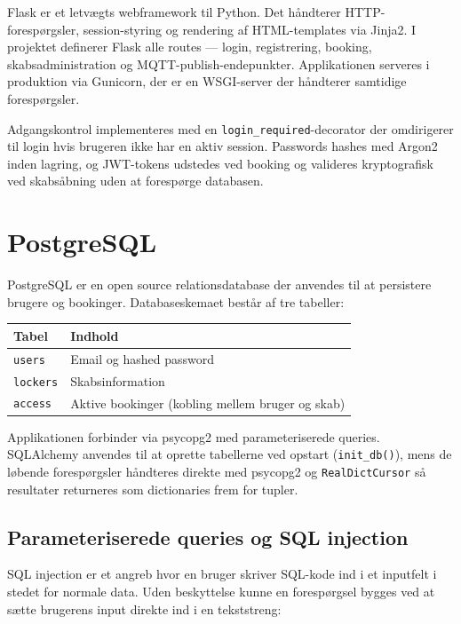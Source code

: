 \documentclass[a4paper,12pt]{article}
\begin{document}
Flask er et letvægts webframework til Python. Det håndterer HTTP-forespørgsler, session-styring og rendering af HTML-templates via Jinja2. I projektet definerer Flask alle routes — login, registrering, booking, skabsadministration og MQTT-publish-endepunkter. Applikationen serveres i produktion via Gunicorn, der er en WSGI-server der håndterer samtidige forespørgsler.

Adgangskontrol implementeres med en \texttt{login\_required}-decorator der omdirigerer til login hvis brugeren ikke har en aktiv session. Passwords hashes med Argon2 inden lagring, og JWT-tokens udstedes ved booking og valideres kryptografisk ved skabsåbning uden at forespørge databasen.

\section{PostgreSQL}

PostgreSQL er en open source relationsdatabase der anvendes til at persistere brugere og bookinger. Databaseskemaet består af tre tabeller:

\begin{center}
\begin{tabular}{ll}
\toprule
\textbf{Tabel} & \textbf{Indhold} \\
\midrule
\texttt{users}   & Email og hashed password \\
\texttt{lockers} & Skabsinformation \\
\texttt{access}  & Aktive bookinger (kobling mellem bruger og skab) \\
\bottomrule
\end{tabular}
\end{center}

Applikationen forbinder via psycopg2 med parameteriserede queries. SQLAlchemy anvendes til at oprette tabellerne ved opstart (\texttt{init\_db()}), mens de løbende forespørgsler håndteres direkte med psycopg2 og \texttt{RealDictCursor} så resultater returneres som dictionaries frem for tupler.

\subsection{Parameteriserede queries og SQL injection}

SQL injection er et angreb hvor en bruger skriver SQL-kode ind i et inputfelt i stedet for normale data. Uden beskyttelse kunne en forespørgsel bygges ved at sætte brugerens input direkte ind i en tekststreng:
\end{document}
